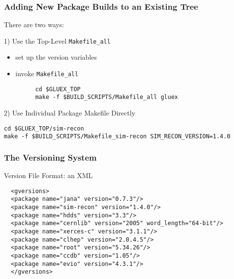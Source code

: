 \documentclass{beamer}
\newcommand{\bi}{\begin{itemize}}
\newcommand{\ei}{\end{itemize}}
\newcommand{\I}{\item}
\begin{document}
\begin{frame}[fragile]
  \frametitle{Adding New Package Builds to an Existing Tree}

There are two ways:

1) Use the Top-Level {\tt Makefile\_all}

\bi
\I set up the version variables
\I invoke {\tt Makefile\_all}
\ei

\begin{verbatim}
         cd $GLUEX_TOP
         make -f $BUILD_SCRIPTS/Makefile_all gluex
\end{verbatim}

2) Use Individual Package Makefile Directly

\begin{verbatim}
cd $GLUEX_TOP/sim-recon
make -f $BUILD_SCRIPTS/Makefile_sim-recon SIM_RECON_VERSION=1.4.0
\end{verbatim}

\end{frame}

\begin{frame}[fragile]
  \frametitle{The Versioning System}\label{section:versioning}

Version File Format: an XML

\begin{verbatim}
  <gversions>
  <package name="jana" version="0.7.3"/>
  <package name="sim-recon" version="1.4.0"/>
  <package name="hdds" version="3.3"/>
  <package name="cernlib" version="2005" word_length="64-bit"/>
  <package name="xerces-c" version="3.1.1"/>
  <package name="clhep" version="2.0.4.5"/>
  <package name="root" version="5.34.26"/>
  <package name="ccdb" version="1.05"/>
  <package name="evio" version="4.3.1"/>
  </gversions>
\end{verbatim}
\end{frame}
\end{document}

